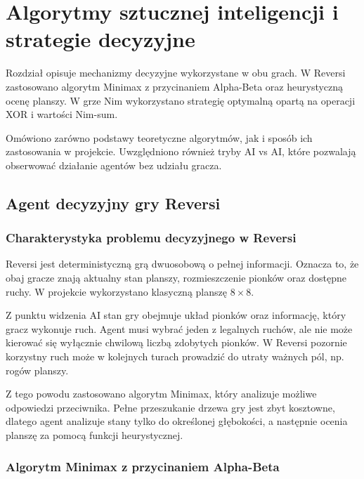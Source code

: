 \chapter{Algorytmy sztucznej inteligencji i strategie decyzyjne}

Rozdział opisuje mechanizmy decyzyjne wykorzystane w obu grach. W Reversi zastosowano algorytm Minimax z przycinaniem Alpha-Beta oraz heurystyczną ocenę planszy. W grze Nim wykorzystano strategię optymalną opartą na operacji XOR i wartości Nim-sum.

Omówiono zarówno podstawy teoretyczne algorytmów, jak i sposób ich zastosowania w projekcie. Uwzględniono również tryby AI vs AI, które pozwalają obserwować działanie agentów bez udziału gracza.

\section{Agent decyzyjny gry Reversi}

\subsection{Charakterystyka problemu decyzyjnego w Reversi}

Reversi jest deterministyczną grą dwuosobową o pełnej informacji. Oznacza to, że obaj gracze znają aktualny stan planszy, rozmieszczenie pionków oraz dostępne ruchy. W projekcie wykorzystano klasyczną planszę $8 \times 8$.

Z punktu widzenia AI stan gry obejmuje układ pionków oraz informację, który gracz wykonuje ruch. Agent musi wybrać jeden z legalnych ruchów, ale nie może kierować się wyłącznie chwilową liczbą zdobytych pionków. W Reversi pozornie korzystny ruch może w kolejnych turach prowadzić do utraty ważnych pól, np. rogów planszy.

Z tego powodu zastosowano algorytm Minimax, który analizuje możliwe odpowiedzi przeciwnika. Pełne przeszukanie drzewa gry jest zbyt kosztowne, dlatego agent analizuje stany tylko do określonej głębokości, a następnie ocenia planszę za pomocą funkcji heurystycznej.

\subsection{Algorytm Minimax z przycinaniem Alpha-Beta}

